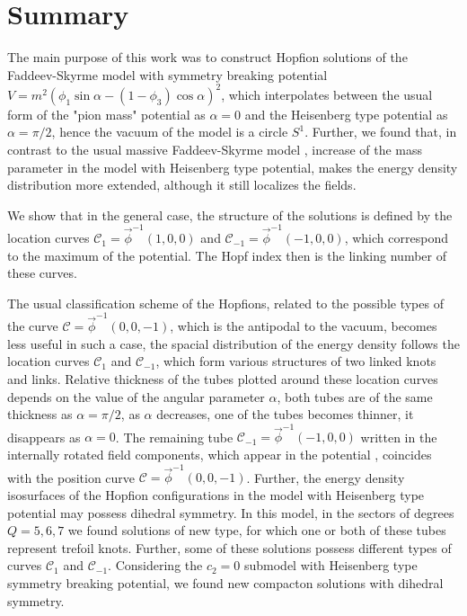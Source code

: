 \documentclass[12pt,a4paper]{article}
\begin{document}
\section{Summary}
The main purpose of this work was to construct  Hopfion solutions of the Faddeev-Skyrme model with symmetry breaking potential
$V=m^2\left(\phi_1\sin\alpha-(1-\phi_3)\cos\alpha\right)^2$, which interpolates between the usual form of the
"pion mass" potential as $\alpha=0$ and the Heisenberg type potential as $\alpha = \pi/2$, hence the vacuum of the model
is a circle $S^1$. Further, we found that, in contrast to the usual massive Faddeev-Skyrme model \cite{Foster:2010zb},
increase of the mass parameter in the model with Heisenberg type potential, makes the energy density distribution more extended,
although it still localizes the fields.

We show that in the general case, the structure of the solutions  is defined by the
location curves $\mathcal{C}_1 = \vec \phi^{-1}(1,0,0)$ and $\mathcal{C}_{-1} = \vec \phi^{-1}(-1,0,0)$, which
correspond to the maximum of the potential. The Hopf index then is the
linking number of these curves.

The usual classification
scheme of the Hopfions, related to the possible types of the curve $\mathcal{C} = \vec \phi^{-1}(0,0,-1)$,
which is the antipodal to the vacuum, becomes less useful in such a case, the spacial distribution of the energy density follows the
location curves $\mathcal{C}_1$ and $\mathcal{C}_{-1}$, which form various structures of two linked knots and links.
Relative thickness of the tubes plotted around these location curves depends on the value of the angular parameter $\alpha$, both
tubes are of the same thickness as $\alpha = \pi/2$, as $\alpha$ decreases, one of the tubes becomes thinner, it disappears as
$\alpha=0$. The remaining tube  $\mathcal{C}_{-1} = \vec \phi^{-1}(-1,0,0)$ written
in the internally rotated field components, which appear in the potential , coincides with the
position curve $\mathcal{C} = \vec \phi^{-1}(0,0,-1)$.
Further, the energy density isosurfaces of the  Hopfion configurations in the model with Heisenberg type potential
may possess dihedral symmetry. In this model, in the sectors of degrees $Q=5,6,7$
we found solutions of new type, for which one or both of these tubes represent
trefoil knots. Further, some of these solutions possess different types of curves  $\mathcal{C}_1$ and $\mathcal{C}_{-1}$.
Considering the $c_2=0$ submodel with Heisenberg type symmetry breaking potential,
we found new compacton solutions with dihedral symmetry.
\end{document}
